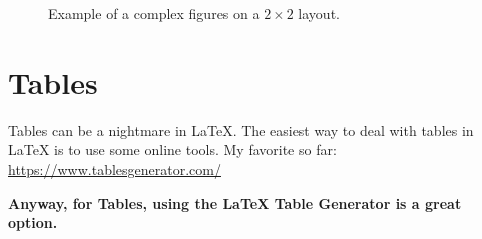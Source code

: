 \begin{figure}[!h]
\begin{subfigure}[t]{.5\textwidth}
  \end{subfigure}
  \caption{Example of a complex figures on a $2\times2$ layout.}
  \label{fig:drake}
\end{figure}

\section{Tables}
Tables can be a nightmare in LaTeX.
The easiest way to deal with tables in LaTeX is to use some online tools.
My favorite so far: \url{https://www.tablesgenerator.com/}

\textbf{Anyway, for Tables, using the LaTeX Table Generator is a great option.}
